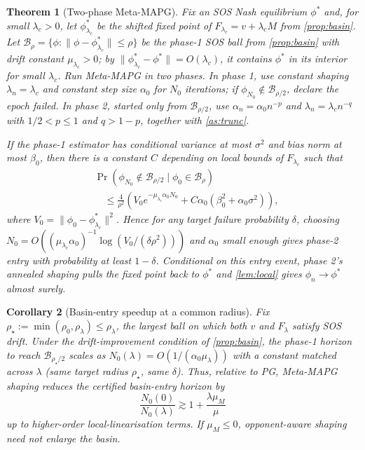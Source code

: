 \documentclass{article}
\theoremstyle{plain}
\newtheorem{theorem}{Theorem}[section]
\newtheorem{corollary}[theorem]{Corollary}
\theoremstyle{definition}
\theoremstyle{remark}
\newcommand{\B}{\mathcal{B}}
\begin{document}
\begin{theorem}[Two-phase Meta-MAPG]\label{thm:two-phase}
Fix an SOS Nash equilibrium $\phi^\ast$ and, for small $\lambda_c>0$, let $\phi^\ast_{\lambda_c}$ be the shifted fixed point of $F_{\lambda_c}=v+\lambda_c M$ from \cref{prop:basin}. Let $\B_\rho=\{\phi:\|\phi-\phi^\ast_{\lambda_c}\|\le\rho\}$ be the phase-1 SOS ball from \cref{prop:basin} with drift constant $\mu_{\lambda_c}>0$; by $\|\phi^\ast_{\lambda_c}-\phi^\ast\|=O(\lambda_c)$, it contains $\phi^\ast$ in its interior for small $\lambda_c$. Run Meta-MAPG in two phases. In phase 1, use constant shaping $\lambda_n=\lambda_c$ and constant step size $\alpha_0$ for $N_0$ iterations; if $\phi_{N_0}\notin\B_{\rho/2}$, declare the epoch failed. In phase 2, started only from $\B_{\rho/2}$, use $\alpha_n=\alpha_0 n^{-p}$ and $\lambda_n=\lambda_c n^{-q}$ with $1/2<p\le 1$ and $q>1-p$, together with \cref{as:trunc}.

If the phase-1 estimator has conditional variance at most $\sigma^2$ and bias norm at most $\beta_0$, then there is a constant $C$ depending on local bounds of $F_{\lambda_c}$ such that
\[
\begin{aligned}
&\Pr(\phi_{N_0}\notin \B_{\rho/2}\mid \phi_0\in\B_\rho)\\
&\quad\le
\frac{4}{\rho^2}\left(
V_0e^{-\mu_{\lambda_c}\alpha_0 N_0}
+C\alpha_0(\beta_0^2+\alpha_0\sigma^2)
\right),
\end{aligned}
\]
where $V_0=\|\phi_0-\phi^\ast_{\lambda_c}\|^2$. Hence for any target failure probability $\delta$, choosing $N_0=O((\mu_{\lambda_c}\alpha_0)^{-1}\log(V_0/(\delta\rho^2)))$ and $\alpha_0$ small enough gives phase-2 entry with probability at least $1-\delta$. Conditional on this entry event, phase 2's annealed shaping pulls the fixed point back to $\phi^\ast$ and \cref{lem:local} gives $\phi_n\to\phi^\ast$ almost surely.
\end{theorem}

\begin{corollary}[Basin-entry speedup at a common radius]\label{cor:speedup}
Fix $\rho_\star:=\min(\rho_0,\rho_\lambda)\le\rho_\lambda$, the largest ball on which \emph{both} $v$ and $F_\lambda$ satisfy SOS drift. Under the drift-improvement condition of \cref{prop:basin}, the phase-1 horizon to reach $\B_{\rho_\star/2}$ scales as $N_0(\lambda)=O(1/(\alpha_0\mu_\lambda))$ with a constant matched across $\lambda$ (same target radius $\rho_\star$, same $\delta$). Thus, relative to PG, Meta-MAPG shaping reduces the certified basin-entry horizon by
\[
\frac{N_0(0)}{N_0(\lambda)}\gtrsim 1+\frac{\lambda\mu_M}{\mu}
\]
up to higher-order local-linearisation terms. If $\mu_M\le0$, opponent-aware shaping need not enlarge the basin.
\end{corollary}
\end{document}
